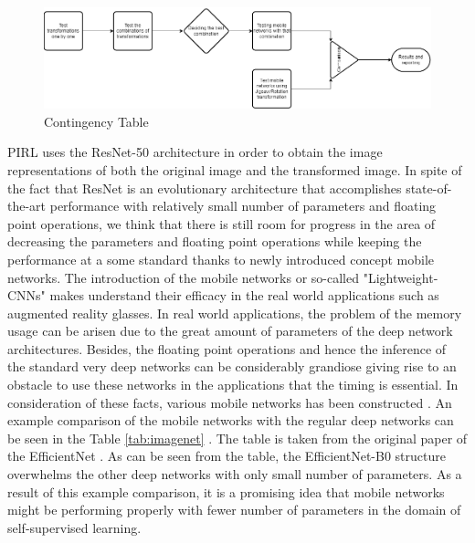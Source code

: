 \documentclass[conference]{IEEEtran}
\begin{document}
\begin{figure}[h]
\includegraphics[width=\textwidth]{flowchartcmpe597.png}
\centering
\caption{Contingency Table}
\label{fig2}
\end{figure}
PIRL uses the ResNet-50 \cite{resnet} architecture in order to obtain the image representations of both the original image and the transformed image. In spite of the fact that ResNet is an evolutionary architecture that accomplishes state-of-the-art performance with relatively small number of parameters and floating point operations, we think that there is still room for progress in the area of decreasing the parameters and floating point operations while keeping the performance at a some standard thanks to newly introduced concept mobile networks. The introduction of the mobile networks or so-called "Lightweight-CNNs" makes understand their efficacy in the real world applications such as augmented reality glasses. In real world applications, the problem of the memory usage can be arisen due to the great amount of parameters of the deep network architectures. Besides, the floating point operations and hence the inference of the standard very deep networks can be considerably grandiose giving rise to an obstacle to use these networks in the applications that the timing is essential. In consideration of these facts, various mobile networks has been constructed \cite{mnasnet,mobile2,efficientnet}. An example comparison of the mobile networks with the regular deep networks can be seen in the Table \ref{tab:imagenet} . The table is taken from the original paper of the EfficientNet \cite{efficientnet}. As can be seen from the table, the EfficientNet-B0 structure overwhelms the other deep networks with only small number of parameters. As a result of this example comparison, it is a promising idea that mobile networks might be performing properly with fewer number of parameters in the domain of self-supervised learning.     
\end{document}
